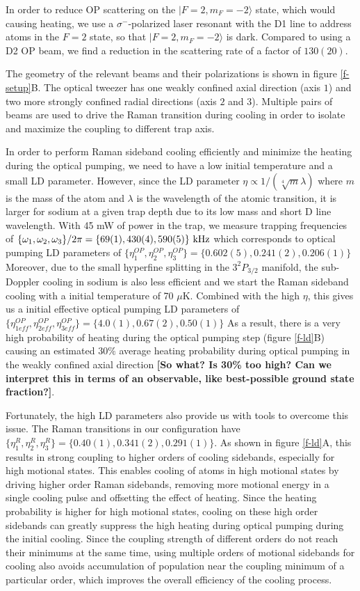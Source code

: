 \documentclass[aps,prl,twocolumn,groupedaddress]{revtex4-1}
\newcommand{\eff}{ef\! f}
\renewcommand{\fxnote}[1]{{\textbf{[#1]}}}
\begin{document}
In order to reduce OP scattering on the $|F=2, m_F=-2\rangle$ state, which would causing heating, we use a $\sigma^-$-polarized laser resonant with the D1 line to address atoms in the $F=2$ state, so that $|F=2, m_F=-2\rangle$ is dark.  Compared to using a D2 OP beam, we find a reduction in the scattering rate of a factor of $130(20)$.


The geometry of the relevant beams and their polarizations is shown in figure \ref{f-setup}B.
The optical tweezer has one weakly confined axial direction (axis $1$) and
two more strongly confined radial directions (axis $2$ and $3$).
Multiple pairs of beams are used to drive the Raman transition during cooling in order to
isolate and maximize the coupling to different trap axis.

In order to perform Raman sideband cooling efficiently and minimize
the heating during the optical pumping, we need to have a low initial temperature and
a small LD parameter. However, since the LD parameter $\eta\propto 1/(\sqrt[4]{m}\lambda)$ where $m$ is the mass of the atom and $\lambda$
is the wavelength of the atomic transition,
it is larger for sodium at a given trap depth due to its low mass and short D line wavelength.
With 45 mW of power in the trap, we measure trapping frequencies of
$\{\omega_1,\omega_2,\omega_3\}/2\pi = \{69(1), 430(4), 590(5)\}\ \text{\text{kHz}}$
which corresponds to optical pumping LD parameters of
$\{\eta^{OP}_1,\eta^{OP}_2,\eta^{OP}_3\} = \{0.602(5), 0.241(2), 0.206(1)\}$
Moreover, due to the small hyperfine splitting in the $3^2P_{3/2}$ manifold,
the sub-Doppler cooling in sodium is also less efficient and we start the
Raman sideband cooling with a initial temperature of 70 $\mu$K. Combined with the high $\eta$, this gives us a initial effective optical pumping LD parameters of
$\{\eta^{OP}_{1\eff},\eta^{OP}_{2\eff},\eta^{OP}_{3\eff}\} = \{4.0(1), 0.67(2), 0.50(1)\}$
As a result, there is a very high probability of heating during the optical pumping step
(figure \ref{f-ld}B) causing an estimated $30\%$ average heating probability during optical pumping
in the weakly confined axial direction \fxnote{So what?  Is 30\% too high?  Can we interpret this in terms of an observable, like best-possible ground state fraction?}.

Fortunately, the high LD parameters also
provide us with tools to overcome this issue. The Raman transitions in our configuration have $\{\eta^R_{1},\eta^R_{2},\eta^R_{3}\} = \{0.40(1), 0.341(2), 0.291(1)\}$. As shown in
figure \ref{f-ld}A, this results in strong coupling to higher orders
of cooling sidebands, especially for high motional states.
This enables cooling of atoms in high motional states by driving higher order Raman sidebands,
removing more motional energy in a single cooling pulse and offsetting the effect of heating. Since the heating probability is higher for high motional states,
cooling on these high order sidebands can greatly suppress the high heating during
optical pumping during the initial cooling. Since the coupling strength of different orders
do not reach their minimums at the same time, using multiple orders of motional sidebands
for cooling also avoids accumulation of population near the coupling minimum of a particular
order, which improves the overall efficiency of the cooling process.
\end{document}
